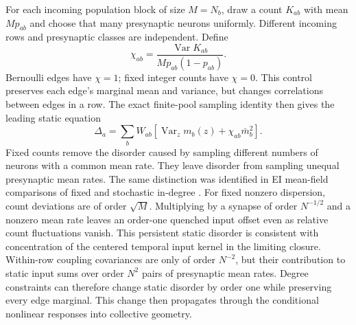 \documentclass[11pt]{article}
\begin{document}
For each incoming population block of size $M=N_b$, draw a count $K_{ab}$
with mean $Mp_{ab}$ and choose that many presynaptic neurons uniformly.
Different incoming rows and presynaptic classes are independent. Define
\begin{equation}
 \chi_{ab}=\frac{\operatorname{Var}K_{ab}}{Mp_{ab}(1-p_{ab})}.
 \label{eq:chi}
\end{equation}
Bernoulli edges have $\chi=1$; fixed integer counts have $\chi=0$.
This control preserves each edge's marginal mean and variance, but changes
correlations between edges in a row. The exact finite-pool sampling identity
then gives the leading static equation
\begin{equation}
 \boxed{\Delta_a=\sum_bW_{ab}
 [\operatorname{Var}_z m_b(z)+\chi_{ab}\bar m_b^2].}
 \label{eq:degreestatic}
\end{equation}
Fixed counts remove the disorder caused by sampling different numbers of
neurons with a common mean rate. They leave disorder from sampling unequal
presynaptic mean rates. The same distinction was identified in EI mean-field
comparisons of fixed and stochastic in-degree \citep{mastrogiuseppe2017}.
For fixed nonzero dispersion, count deviations are of order $\sqrt M$.
Multiplying by a synapse of order $N^{-1/2}$ and a nonzero mean rate leaves
an order-one quenched input offset even as relative count fluctuations
vanish. This persistent static disorder is consistent with concentration
of the centered temporal input kernel in the limiting closure.
Within-row coupling covariances are only of order $N^{-2}$, but their
contribution to static input sums over order $N^2$ pairs of presynaptic mean
rates. Degree constraints can therefore change static disorder by order one
while preserving every edge marginal. This change then propagates through
the conditional nonlinear responses into collective geometry.
\end{document}
